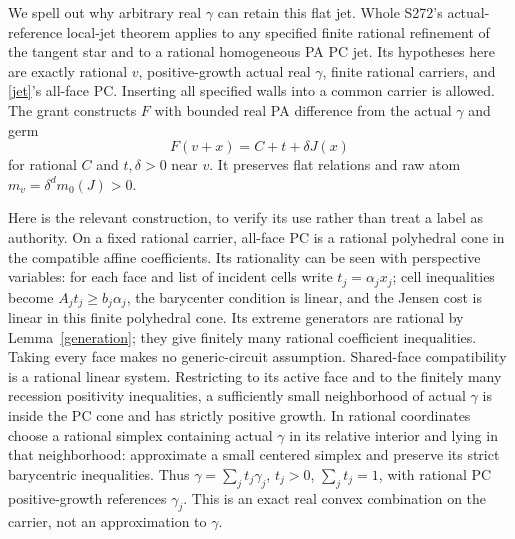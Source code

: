 \documentclass[11pt]{article}
\theoremstyle{definition}\newtheorem{definition}[theorem]{Definition}
\theoremstyle{remark}\newtheorem{remark}[theorem]{Remark}
\begin{document}
We spell out why arbitrary real $\gamma$ can retain this flat jet. Whole S272's actual-reference local-jet theorem applies to any specified finite rational refinement of the tangent star and to a rational homogeneous PA PC jet. Its hypotheses here are exactly rational $v$, positive-growth actual real $\gamma$, finite rational carriers, and \eqref{jet}'s all-face PC. Inserting all specified walls into a common carrier is allowed. The grant constructs $F$ with bounded real PA difference from the actual $\gamma$ and germ
\begin{equation}\label{realized}
F(v+x)=C+t+\delta J(x)
\end{equation}
for rational $C$ and $t,\delta>0$ near $v$. It preserves flat relations and raw atom $m_v=\delta^d m_0(J)>0$.

Here is the relevant construction, to verify its use rather than treat a label as authority. On a fixed rational carrier, all-face PC is a rational polyhedral cone in the compatible affine coefficients. Its rationality can be seen with perspective variables: for each face and list of incident cells write $t_j=\alpha_jx_j$; cell inequalities become $A_jt_j\geq b_j\alpha_j$, the barycenter condition is linear, and the Jensen cost is linear in this finite polyhedral cone. Its extreme generators are rational by Lemma~\ref{generation}; they give finitely many rational coefficient inequalities. Taking every face makes no generic-circuit assumption. Shared-face compatibility is a rational linear system. Restricting to its active face and to the finitely many recession positivity inequalities, a sufficiently small neighborhood of actual $\gamma$ is inside the PC cone and has strictly positive growth. In rational coordinates choose a rational simplex containing actual $\gamma$ in its relative interior and lying in that neighborhood: approximate a small centered simplex and preserve its strict barycentric inequalities. Thus
$\gamma=\sum_j t_j\gamma_j$, $t_j>0$, $\sum_jt_j=1$, with rational PC positive-growth references $\gamma_j$. This is an exact real convex combination on the carrier, not an approximation to $\gamma$.
\end{document}
